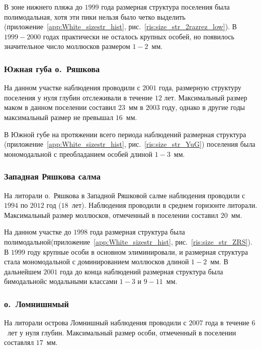 В зоне нижнего пляжа до $1999$ года размерная структура поселения была полимодальная, хотя эти пики нельзя было четко выделить (приложение~\ref{app:White_sizestr_hist}, рис.~\ref{ris:size_str_2razrez_low}). 
В $1999-2000$ годах практически не осталось крупных особей, но появилось значительное число моллюсков размером $1-2$~мм. 

		\subsubsection{Южная губа о.~Ряшкова}

На данном участке наблюдения проводили с $2001$ года, размерную структуру поселения у нуля глубин отслеживали в течение $12$ лет.
Максимальный размер маком в данном поселении составил $23$~мм в $2003$ году, однако в другие годы максимальный размер не превышал $16$~мм.

В Южной губе на протяжении всего периода наблюдений размерная структура (приложение~\ref{app:White_sizestr_hist}, рис.~\ref{ris:size_str_YuG}) поселения была мономодальной с преобладанием особей длиной $1-3$~мм. 



		\subsubsection{Западная Ряшкова салма}

На литорали о.~Ряшкова в Западной Ряшковой салме наблюдения проводили с $1994$ по $2012$ год ($18$~лет). Наблюдения проводили в среднем горизонте литорали.
Максимальный размер моллюсков, отмеченный в поселении составил $20$~мм.

На данном участке  до $1998$ года размерная структура была полимодальной(приложение~\ref{app:White_sizestr_hist}, рис.~\ref{ris:size_str_ZRS}). 
В $1999$ году крупные особи в основном элиминировали, и размерная структура стала мономодальной с доминированием моллюсков длиной $1-2$~мм.
В дальнейшем $2001$ года до конца наблюдений размерная структура была бимодальнойс модальными классами $1-3$ и $9-11$~мм.


		\subsubsection{о.~Ломнишнмый}

На литорали острова Ломнишный наблюдения проводили с $2007$ года в течение $6$~лет у нуля глубин. 
Максимальный размер особи, отмеченный в поселении составлял $17$~мм.

